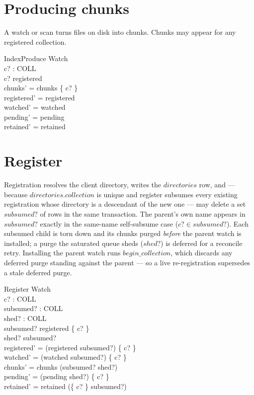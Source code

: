 \documentclass[a4paper]{article}
\begin{document}
\section{Producing chunks}

A watch or scan turns files on disk into chunks.  Chunks may appear for any
registered collection.

\begin{schema}{IndexProduce}
  \Delta Watch \\
  c? : COLL \\
  \where
  c? \in registered \\
  chunks' = chunks \cup \{ c? \} \\
  registered' = registered \\
  watched' = watched \\
  pending' = pending \\
  retained' = retained
\end{schema}

\section{Register}

Registration resolves the client directory, writes the $directories$ row, and
--- because $directories.collection$ is unique and register subsumes every
existing registration whose directory is a descendant of the new one --- may
delete a set $subsumed?$ of rows in the same transaction.  The parent's own name
appears in $subsumed?$ exactly in the same-name self-subsume case ($c? \in
subsumed?$).  Each subsumed child is torn down and its chunks purged
\textit{before} the parent watch is installed; a purge the saturated queue sheds
($shed?$) is deferred for a reconcile retry.  Installing the parent watch runs
$begin\_collection$, which discards any deferred purge standing against the
parent --- so a live re-registration supersedes a stale deferred purge.

\begin{schema}{Register}
  \Delta Watch \\
  c? : COLL \\
  subsumed? : \power COLL \\
  shed? : \power COLL \\
  \where
  subsumed? \subseteq registered \cup \{ c? \} \\
  shed? \subseteq subsumed? \\
  registered' = (registered \setminus subsumed?) \cup \{ c? \} \\
  watched' = (watched \setminus subsumed?) \cup \{ c? \} \\
  chunks' = chunks \setminus (subsumed? \setminus shed?) \\
  pending' = (pending \cup shed?) \setminus \{ c? \} \\
  retained' = retained \setminus (\{ c? \} \cup subsumed?)
\end{schema}
\end{document}
